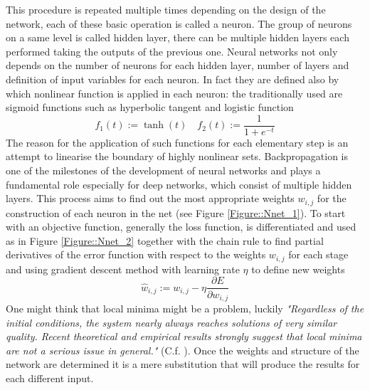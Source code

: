 \documentclass[a4paper,12pt]{article}
\begin{document}
This procedure is repeated multiple times depending on the design of the network, each of these basic operation is called a neuron.
The group of neurons on a same level is called hidden layer, there can be multiple hidden layers each performed taking the outputs of the previous one.
Neural networks not only depends on the number of neurons for each hidden layer, number of layers and definition of input variables for each neuron. In fact they are defined also by which nonlinear function is applied in each neuron: the traditionally used are sigmoid functions such as hyperbolic tangent and logistic function $$f_{1}(t):=\tanh(t) \quad f_{2}(t):= \frac{1}{1+ e^{-t}} $$The reason for the application of such functions for each elementary step is an attempt to linearise the boundary of highly nonlinear sets. 
Backpropagation is one of the milestones of the development of neural networks and plays a fundamental role especially for deep networks, which consist of multiple hidden layers.
This process aims to find out the most appropriate weights $w_{i,j}$ for the construction of each neuron in the net (see Figure \ref{Figure::Nnet_1}).
To start with an objective function, generally the loss function, is differentiated and used as in Figure \ref{Figure::Nnet_2} together with the chain rule to find partial derivatives of the error function with respect to the weights $w_{i,j}$ for each stage and using gradient descent method with learning rate $\eta$ to define new weights $$\hat{w}_{i,j}:=w_{i,j}- \eta \frac{\partial E}{\partial w_{i,j}}$$
One might think that local minima might be a problem, luckily \textit{"Regardless of the initial conditions, the system nearly always reaches solutions of very similar quality. Recent theoretical and empirical results strongly suggest that local minima are not a serious issue in general."} (C.f. \cite{nature}).
Once the weights and structure of the network are determined it is a mere substitution that will produce the results for each different input.
\end{document}

